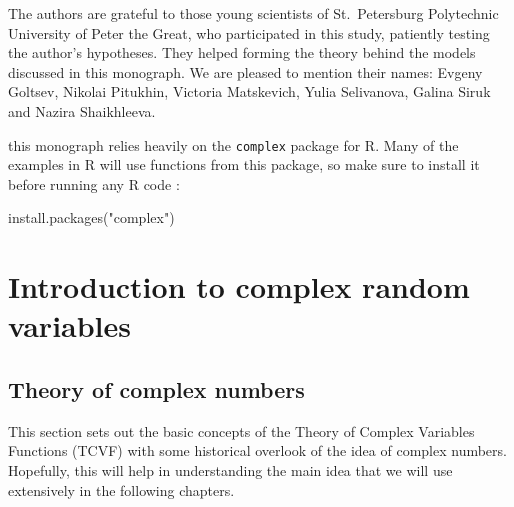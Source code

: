 \documentclass[
]{book}
\newenvironment{Shaded}{\begin{snugshade}}{\end{snugshade}}
\newcommand{\FunctionTok}[1]{\textcolor[rgb]{0.00,0.00,0.00}{#1}}
\newcommand{\NormalTok}[1]{#1}
\newcommand{\StringTok}[1]{\textcolor[rgb]{0.31,0.60,0.02}{#1}}
\begin{document}
The authors are grateful to those young scientists of St.~Petersburg Polytechnic University of Peter the Great, who participated in this study, patiently testing the author's hypotheses. They helped forming the theory behind the models discussed in this monograph. We are pleased to mention their names: Evgeny Goltsev, Nikolai Pitukhin, Victoria Matskevich, Yulia Selivanova, Galina Siruk and Nazira Shaikhleeva.

this monograph relies heavily on the \texttt{complex} package for R. Many of the examples in R will use functions from this package, so make sure to install it before running any R code \citep{R-complex}:

\begin{Shaded}
\begin{Highlighting}[]
\FunctionTok{install.packages}\NormalTok{(}\StringTok{"complex"}\NormalTok{)}
\end{Highlighting}
\end{Shaded}

\hypertarget{intro}{%
\chapter{Introduction to complex random variables}\label{intro}}

\hypertarget{theoryOfComplexNumbers}{%
\section{Theory of complex numbers}\label{theoryOfComplexNumbers}}

This section sets out the basic concepts of the Theory of Complex Variables Functions (TCVF) with some historical overlook of the idea of complex numbers. Hopefully, this will help in understanding the main idea that we will use extensively in the following chapters.
\end{document}
